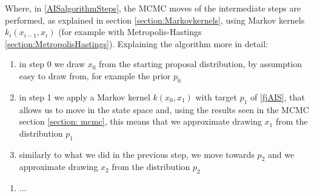 \documentclass[12pt,mythesisstyle]{report}
\begin{document}
Where, in \eqref{AISalgorithmSteps}, the MCMC moves of the intermediate steps are performed, as explained in section \ref{section:Markovkernels}, using Markov kernels $k_i(x_{i-1},x_i)$ (for example with Metropolis-Hastings \ref{section:MetropolisHastings}). Explaining the algorithm more in detail: 
\begin{enumerate}\addtocounter{enumi}{-1}
	\item in step 0 we draw $x_{0}$ from the starting proposal distribution, by assumption easy to draw from, for example the prior $p_{0}$
	\item in step 1 we apply a Markov kernel $k(x_0,x_1)$ with target $p_1$ of \eqref{fjAIS}, that allows us to move in the state space and, using the results seen in the MCMC section \ref{section: mcmc}, this means that we approximate drawing $x_1$ from the distribution $p_1$
	\item similarly to what we did in the previous step, we move towards $p_2$ and we approximate drawing $x_2$ from the distribution $p_2$
\end{enumerate}
\begin{enumerate}[label=...]
	\item ...
\end{enumerate}
\end{document}
